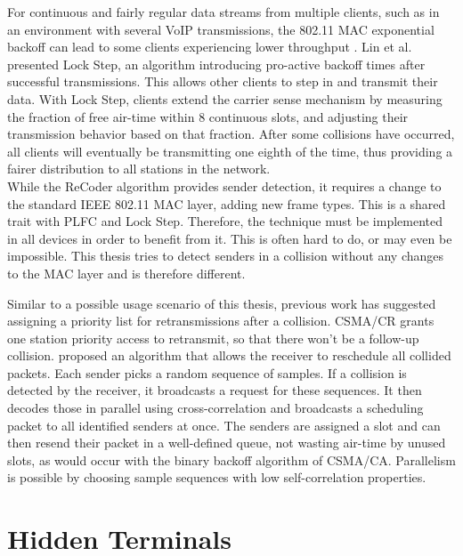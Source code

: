 For continuous and fairly regular data streams from multiple clients, such as in an environment with several VoIP transmissions, the 802.11 MAC exponential backoff can lead to some clients experiencing lower throughput \cite{lin2009}. Lin et al. presented Lock Step, an algorithm introducing pro-active backoff times after successful transmissions. This allows other clients to step in and transmit their data. With Lock Step, clients extend the carrier sense mechanism by measuring the fraction of free air-time within 8 continuous slots, and adjusting their transmission behavior based on that fraction. After some collisions have occurred, all clients will eventually be transmitting one eighth of the time, thus providing a fairer distribution to all stations in the network.\\

While the ReCoder algorithm provides sender detection, it requires a change to the standard IEEE 802.11 MAC layer, adding new frame types. This is a shared trait with \gls{PLFC} and Lock Step. Therefore, the technique must be implemented in all devices in order to benefit from it. This is often hard to do, or may even be impossible. This thesis tries to detect senders in a collision without any changes to the MAC layer and is therefore different.

Similar to a possible usage scenario of this thesis, previous work has suggested assigning a priority list for retransmissions after a collision. \gls{CSMA/CR} \cite{choi2013} grants one station priority access to retransmit, so that there won't be a follow-up collision. \cite{zhao2015} proposed an algorithm that allows the receiver to reschedule all collided packets. Each sender picks a random sequence of samples. If a collision is detected by the receiver, it broadcasts a request for these sequences. It then decodes those in parallel using cross-correlation and broadcasts a scheduling packet to all identified senders at once. The senders are assigned a slot and can then resend their packet in a well-defined queue, not wasting air-time by unused slots, as would occur with the binary backoff algorithm of \gls{CSMA/CA}. Parallelism is possible by choosing sample sequences with low self-correlation properties.



\section{Hidden Terminals}

